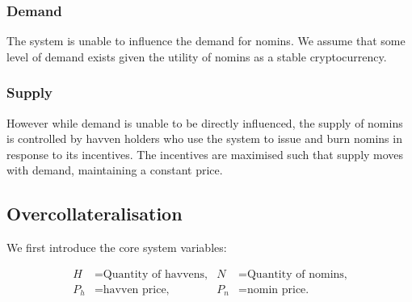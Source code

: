 \begin{center}
\end{center}
	
\subsubsection*{Demand}

\noindent The system is unable to influence the demand for nomins. We assume that some level of demand exists given the utility of nomins as a stable cryptocurrency.

\subsubsection*{Supply}

\noindent However while demand is unable to be directly influenced, the supply of nomins is controlled by havven holders who use the system to issue and burn nomins in response to its incentives. The incentives are maximised such that supply moves with demand, maintaining a constant price.\\

\subsection{Overcollateralisation}

\noindent We first introduce the core system variables:

\begin{align*}
H &= \text{Quantity of havvens,} & N &= \text{Quantity of nomins,} \\
P_h &= \text{havven price,}  & P_n &= \text{nomin price.}
\end{align*}

